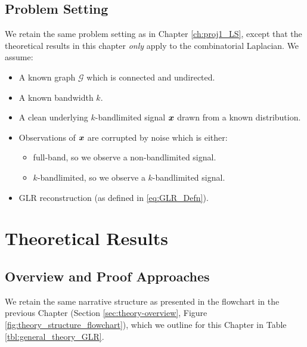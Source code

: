 \subsection{Problem Setting}
We retain the same problem setting as in Chapter \ref{ch:proj1_LS}, except that the theoretical results in this chapter \emph{only} apply to the combinatorial Laplacian. We assume:
\begin{itemize}
    \item A known graph $\mathcal{G}$ which is connected and undirected.
    \item A known bandwidth $k$.
    \item A clean underlying $k$-bandlimited signal $\bm{x}$ drawn from a known distribution.
    \item Observations of $\bm{x}$ are corrupted by noise which is either:
    \begin{itemize}
        \item full-band, so we observe a non-bandlimited signal.
        \item $k$-bandlimited, so we observe a $k$-bandlimited signal.
    \end{itemize}
    \item GLR reconstruction (as defined in \eqref{eq:GLR_Defn}).
\end{itemize}

\section{Theoretical Results}
\subsection{Overview and Proof Approaches}
We retain the same narrative structure as presented in the flowchart in the previous Chapter (Section \ref{sec:theory-overview}, Figure \ref{fig:theory_structure_flowchart}), which we outline for this Chapter in Table \ref{tbl:general_theory_GLR}.

